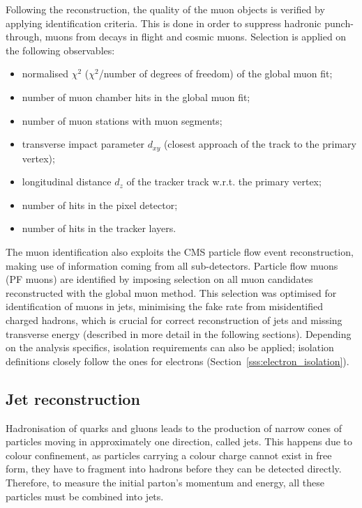 Following the reconstruction, the quality of the muon objects is verified by applying identification criteria. This is
done in order to suppress hadronic punch-through, muons from decays in flight and cosmic muons. Selection is applied on
the following observables:
\begin{itemize}
  \item normalised $\chi^2$ ($\chi^2$/number of degrees of freedom) of the global muon fit;
  \item number of muon chamber hits in the global muon fit;
  \item number of muon stations with muon segments;
  \item transverse impact parameter $d_{xy}$ (closest approach of the track to the primary vertex);
  \item longitudinal distance $d_z$ of the tracker track w.r.t. the primary vertex;
  \item number of hits in the pixel detector;
  \item number of hits in the tracker layers.
\end{itemize}

The muon identification also exploits the CMS particle flow event reconstruction, making use of information coming from
all sub-detectors. Particle flow muons (PF muons) are identified by imposing selection on all muon candidates
reconstructed with the global muon method. This selection was optimised for identification of muons in jets, minimising
the fake rate from misidentified charged hadrons, which is crucial for correct reconstruction of jets and missing
transverse energy (described in more detail in the following sections). Depending on the analysis specifics, isolation
requirements can also be applied; isolation definitions closely follow the ones for electrons
(Section~\ref{sss:electron_isolation}).

\newpage
\subsection{Jet reconstruction}
\label{ss:jet_reconstruction}
Hadronisation of quarks and gluons leads to the production of narrow cones of particles moving in approximately one
direction, called jets. This happens due to colour confinement, as particles carrying a colour charge cannot exist in
free form, they have to fragment into hadrons before they can be detected directly. Therefore, to measure the initial
parton's momentum and energy, all these particles must be combined into jets.

